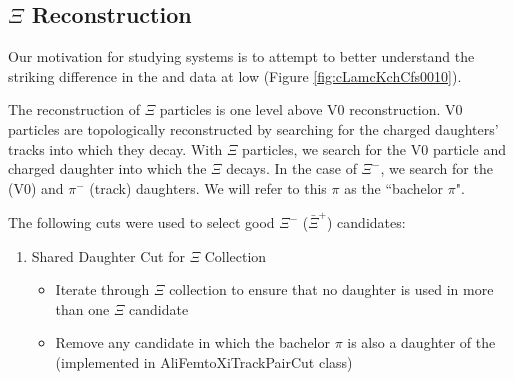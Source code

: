 \documentclass[/home/jesse/Analysis/FemtoAnalysis/AnalysisNotes/AnalysisNoteJBuxton.tex]{subfiles}
\begin{document}
\subsection{$\Xi$ Reconstruction}
\label{CascadeReconstruction}

Our motivation for studying \XiKpm systems is to attempt to better understand the striking difference in the \LamKchP and \LamKchM data at low \kstar (Figure \ref{fig:cLamcKchCfs0010}).

The reconstruction of $\Xi$ particles is one level above V0 reconstruction.  V0 particles are topologically reconstructed by searching for the charged daughters' tracks into which they decay.  With $\Xi$ particles, we search for the V0 particle and charged daughter into which the $\Xi$ decays.  In the case of $\Xi^{-}$, we search for the \Lam (V0) and $\pi^{-}$ (track) daughters.  We will refer to this $\pi$ as the ``bachelor $\pi$".

The following cuts were used to select good $\Xi^{-}$ ($\bar{\Xi}^{+}$) candidates:

\begin{enumerate} 
 \item Shared Daughter Cut for $\Xi$ Collection
 \begin{itemize}
  \item Iterate through $\Xi$ collection to ensure that no daughter is used in more than one $\Xi$ candidate
  \item Remove any candidate in which the bachelor $\pi$ is also a daughter of the \Lam (implemented in AliFemtoXiTrackPairCut class)
 \end{itemize} 
 
\end{enumerate}
\end{document}
